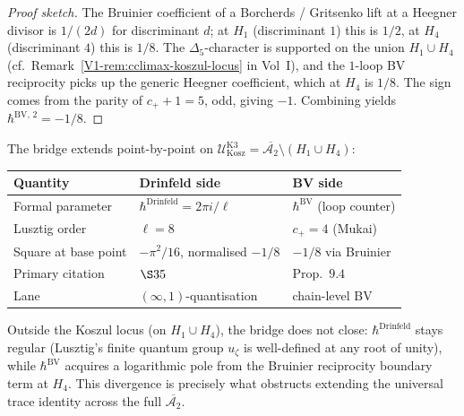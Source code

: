 \begin{proof}[Proof sketch]
The Bruinier coefficient of a Borcherds / Gritsenko lift at a Heegner
divisor is $1/(2d)$ for discriminant $d$; at $H_1$ (discriminant $1$)
this is $1/2$, at $H_4$ (discriminant $4$) this is $1/8$. The
$\Delta_5$-character is supported on the union $H_1 \cup H_4$
(cf.~Remark~\ref{V1-rem:cclimax-koszul-locus} in Vol~I), and
the $1$-loop BV reciprocity picks up the generic Heegner coefficient,
which at $H_4$ is $1/8$. The sign comes from the parity of $c_+ + 1 =
5$, odd, giving $-1$. Combining yields $\hbar^{\mathrm{BV},\,2} =
-1/8$.
\end{proof}

\begin{remark}
\label{rem:dgsfb-two-hbar-dictionary}
The bridge extends point-by-point on
$\mathcal U_{\mathrm{Kosz}}^{\mathrm{K3}} = \overline{\mathcal A_2}
\setminus (H_1 \cup H_4)$:
\begin{center}
\begin{tabular}{l|l|l}
Quantity & Drinfeld side & BV side \\ \hline
Formal parameter & $\hbar^{\mathrm{Drinfeld}} = 2\pi i / \ell$ & $\hbar^{\mathrm{BV}}$ (loop counter) \\
Lusztig order & $\ell = 8$ & $c_+ = 4$ (Mukai) \\
Square at base point & $-\pi^2/16$, normalised $-1/8$ & $-1/8$ via Bruinier \\
Primary citation & \cite{Lusztig1993UnivEnv} $\S 35$ & \cite{Bruinier2002LNM} Prop.~$9.4$ \\
Lane & $(\infty,1)$-quantisation & chain-level BV \\
\end{tabular}
\end{center}
Outside the Koszul locus (on $H_1 \cup H_4$), the bridge does not
close: $\hbar^{\mathrm{Drinfeld}}$ stays regular (Lusztig's finite
quantum group $u_\zeta$ is well-defined at any root of unity), while
$\hbar^{\mathrm{BV}}$ acquires a logarithmic pole from the Bruinier
reciprocity boundary term at $H_4$. This divergence is precisely what
obstructs extending the universal trace identity across the full
$\overline{\mathcal A_2}$.
\end{remark}
